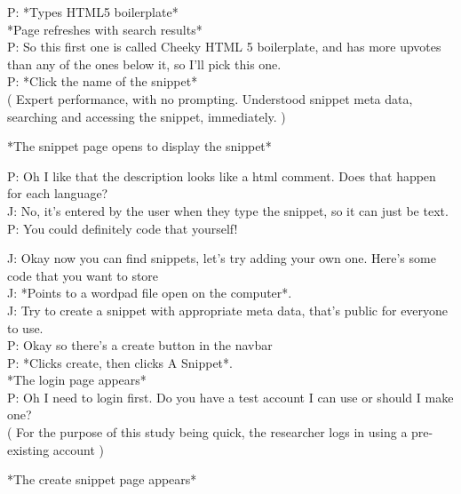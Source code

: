 P: *Types HTML5 boilerplate*  \\
*Page refreshes with search results*  \\
P: So this first one is called Cheeky HTML 5 boilerplate, and has more upvotes than any of the ones below it, so I'll pick this one. \\
P: *Click the name of the snippet* \\
( Expert performance, with no prompting. Understood snippet meta data, searching and accessing the snippet, immediately. )

*The snippet page opens to display the snippet*

P: Oh I like that the description looks like a html comment. Does that happen for each language? \\
J: \-\hspace{1.4cm}No, it's entered by the user when they type the snippet, so it can just be text. \\
P: You could definitely code that yourself! 

J: \-\hspace{1.4cm}Okay now you can find snippets, let's try adding your own one. Here's some code that you want to store  \\
J: \-\hspace{1.4cm}*Points to a wordpad file open on the computer*.  \\
J: \-\hspace{1.4cm}Try to create a snippet with appropriate meta data, that's public for everyone to use. \\
P: Okay so there's a create button in the navbar  \\
P: *Clicks create, then clicks A Snippet*.  \\
*The login page appears* \\
P: Oh I need to login first. Do you have a test account I can use or should I make one? \\
( For the purpose of this study being quick, the researcher logs in using a pre-existing account )

*The create snippet page appears*

